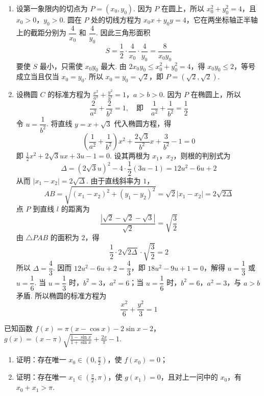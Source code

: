 \begin{solution}
\begin{enumerate}
\item 设第一象限内的切点为 \(P=(x_{0},y_{0})\). 因为 \(P\) 在圆上，所以 \(x_{0}^{2}+y_{0}^{2}=4\)，且 \(x_{0}>0\)，\(y_{0}>0\). 圆在 \(P\) 处的切线方程为 \(x_{0}x+y_{0}y=4\)，它在两坐标轴正半轴上的截距分别为 \(\dfrac{4}{x_{0}}\) 和 \(\dfrac{4}{y_{0}}\). 因此三角形面积
\[
S=\frac{1}{2}\cdot\frac{4}{x_{0}}\cdot\frac{4}{y_{0}}=\frac{8}{x_{0}y_{0}}
\]
要使 \(S\) 最小，只需使 \(x_{0}y_{0}\) 最大. 由 \(2x_{0}y_{0}\leqslant x_{0}^{2}+y_{0}^{2}=4\)，得 \(x_{0}y_{0}\leqslant2\)，等号成立当且仅当 \(x_{0}=y_{0}\). 所以 \(x_{0}=y_{0}=\sqrt{2}\)，即 \(P=(\sqrt{2},\sqrt{2})\).
\item 设椭圆 \(C\) 的标准方程为
\(\frac{x^{2}}{a^{2}}+\frac{y^{2}}{b^{2}}=1\)，\(a>b>0\).
因为 \(P\) 在椭圆上，所以
\[
\frac{2}{a^{2}}+\frac{2}{b^{2}}=1,\quad \text{即}\quad \frac{1}{a^{2}}+\frac{1}{b^{2}}=\frac{1}{2}
\]
令 \(u=\dfrac{1}{b^{2}}\). 将直线 \(y=x+\sqrt{3}\) 代入椭圆方程，得
\[
\left(\frac{1}{a^{2}}+\frac{1}{b^{2}}\right)x^{2}+\frac{2\sqrt{3}}{b^{2}}x+\frac{3}{b^{2}}-1=0
\]
即 \(\frac{1}{2}x^{2}+2\sqrt{3}ux+3u-1=0\).
设其两根为 \(x_{1}\)，\(x_{2}\)，则根的判别式为
\[
\Delta=(2\sqrt{3}u)^{2}-4\cdot\frac{1}{2}(3u-1)=12u^{2}-6u+2
\]
从而 \(\lvert x_{1}-x_{2}\rvert=2\sqrt{\Delta}\). 由于直线斜率为 \(1\)，
\[
AB=\sqrt{(x_{1}-x_{2})^{2}+(y_{1}-y_{2})^{2}}=\sqrt{2}\lvert x_{1}-x_{2}\rvert=2\sqrt{2\Delta}
\]
点 \(P\) 到直线 \(l\) 的距离为
\[
\frac{\left|\sqrt{2}-\sqrt{2}-\sqrt{3}\right|}{\sqrt{2}}=\sqrt{\frac{3}{2}}
\]
由 \(\triangle PAB\) 的面积为 \(2\)，得
\[
\frac{1}{2}\cdot2\sqrt{2\Delta}\cdot\sqrt{\frac{3}{2}}=2
\]
所以 \(\Delta=\dfrac{4}{3}\). 因而 \(12u^{2}-6u+2=\dfrac{4}{3}\)，即 \(18u^{2}-9u+1=0\)，解得 \(u=\dfrac{1}{3}\) 或 \(u=\dfrac{1}{6}\). 当 \(u=\dfrac{1}{3}\) 时，\(b^{2}=3\)，\(a^{2}=6\)；当 \(u=\dfrac{1}{6}\) 时，\(b^{2}=6\)，\(a^{2}=3\)，与 \(a>b\) 矛盾. 所以椭圆的标准方程为
\[
\frac{x^{2}}{6}+\frac{y^{2}}{3}=1
\]
\end{enumerate}
\end{solution}

\begin{problem}
已知函数 \(f(x) = \pi (x - \cos x) - 2\sin x - 2\)，\(g(x) = (x - \pi)\sqrt{\frac{1 - \sin x}{1 + \sin x}} + \frac{2x}{\pi} - 1\).
\begin{enumerate}
\item 证明：存在唯一 \(x_0 \in \left(0, \frac{\pi}{2}\right)\)，使 \(f(x_0) = 0\)；
\item 证明：存在唯一 \(x_1 \in \left(\frac{\pi}{2}, \pi\right)\)，使 \(g(x_1) = 0\)，且对上一问中的 \(x_0\)，有 \(x_0 + x_1 > \pi\).
\end{enumerate}
\end{problem}

